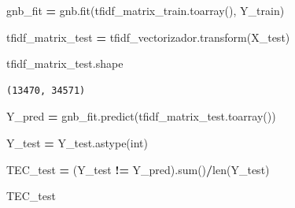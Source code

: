 \documentclass[
  11pt,
  a4paper,
]{article}
\newenvironment{Shaded}{\begin{snugshade}}{\end{snugshade}}
\newcommand{\BuiltInTok}[1]{#1}
\newcommand{\NormalTok}[1]{#1}
\newcommand{\OperatorTok}[1]{\textcolor[rgb]{0.81,0.36,0.00}{\textbf{#1}}}
\newcommand{\StringTok}[1]{\textcolor[rgb]{0.31,0.60,0.02}{#1}}
\begin{document}
\begin{Shaded}
\begin{Highlighting}[]
\NormalTok{gnb\_fit }\OperatorTok{=}\NormalTok{ gnb.fit(tfidf\_matrix\_train.toarray(), Y\_train)}
\end{Highlighting}
\end{Shaded}

\begin{Shaded}
\begin{Highlighting}[]
\NormalTok{tfidf\_matrix\_test }\OperatorTok{=}\NormalTok{ tfidf\_vectorizador.transform(X\_test)}
\end{Highlighting}
\end{Shaded}

\begin{Shaded}
\begin{Highlighting}[]
\NormalTok{tfidf\_matrix\_test.shape}
\end{Highlighting}
\end{Shaded}

\begin{verbatim}
(13470, 34571)
\end{verbatim}

\begin{Shaded}
\begin{Highlighting}[]
\NormalTok{Y\_pred }\OperatorTok{=}\NormalTok{ gnb\_fit.predict(tfidf\_matrix\_test.toarray())}
\end{Highlighting}
\end{Shaded}

\begin{Shaded}
\begin{Highlighting}[]
\NormalTok{Y\_test }\OperatorTok{=}\NormalTok{ Y\_test.astype(}\StringTok{\textquotesingle{}int\textquotesingle{}}\NormalTok{)}
\end{Highlighting}
\end{Shaded}

\begin{Shaded}
\begin{Highlighting}[]
\NormalTok{TEC\_test }\OperatorTok{=}\NormalTok{ (Y\_test }\OperatorTok{!=}\NormalTok{ Y\_pred).}\BuiltInTok{sum}\NormalTok{()}\OperatorTok{/}\BuiltInTok{len}\NormalTok{(Y\_test)}
\end{Highlighting}
\end{Shaded}

\begin{Shaded}
\begin{Highlighting}[]
\NormalTok{TEC\_test}
\end{Highlighting}
\end{Shaded}
\end{document}
